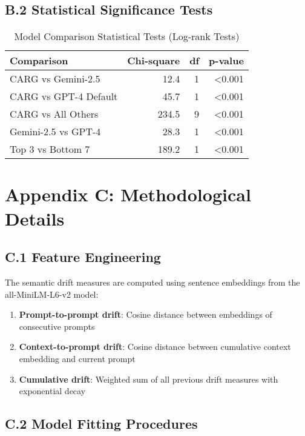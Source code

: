 \documentclass[letterpaper]{article}
\begin{document}
\subsection*{B.2 Statistical Significance Tests}

\begin{table}[ht]
\centering
\caption{Model Comparison Statistical Tests (Log-rank Tests)}
\label{tab:statistical_tests}
\begin{tabular}{lrrr}
\toprule
\textbf{Comparison} & \textbf{Chi-square} & \textbf{df} & \textbf{p-value} \\
\midrule
CARG vs Gemini-2.5 & 12.4 & 1 & <0.001 \\
CARG vs GPT-4 Default & 45.7 & 1 & <0.001 \\
CARG vs All Others & 234.5 & 9 & <0.001 \\
Gemini-2.5 vs GPT-4 & 28.3 & 1 & <0.001 \\
Top 3 vs Bottom 7 & 189.2 & 1 & <0.001 \\
\bottomrule
\end{tabular}
\end{table}

\section*{Appendix C: Methodological Details}

\subsection*{C.1 Feature Engineering}

The semantic drift measures are computed using sentence embeddings from the all-MiniLM-L6-v2 model:

\begin{enumerate}
\item \textbf{Prompt-to-prompt drift}: Cosine distance between embeddings of consecutive prompts
\item \textbf{Context-to-prompt drift}: Cosine distance between cumulative context embedding and current prompt
\item \textbf{Cumulative drift}: Weighted sum of all previous drift measures with exponential decay
\end{enumerate}

\subsection*{C.2 Model Fitting Procedures}
\end{document}
